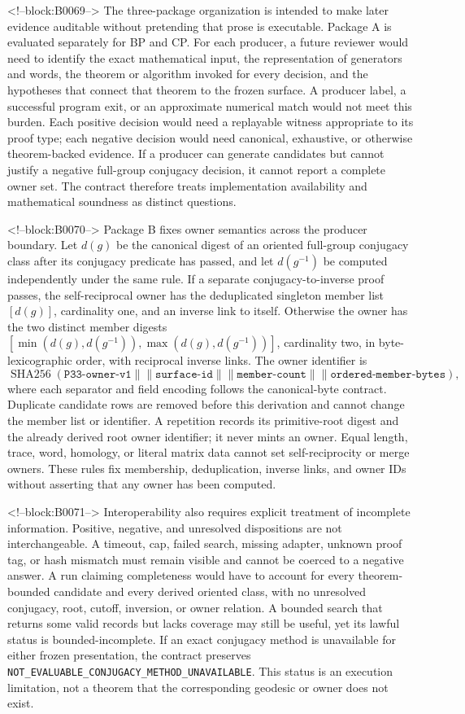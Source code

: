 \documentclass[11pt,a4paper]{article}
\begin{document}
<!--block:B0069-->
The three-package organization is intended to make later evidence auditable without pretending that prose is executable. Package A is evaluated separately for BP and CP. For each producer, a future reviewer would need to identify the exact mathematical input, the representation of generators and words, the theorem or algorithm invoked for every decision, and the hypotheses that connect that theorem to the frozen surface. A producer label, a successful program exit, or an approximate numerical match would not meet this burden. Each positive decision would need a replayable witness appropriate to its proof type; each negative decision would need canonical, exhaustive, or otherwise theorem-backed evidence. If a producer can generate candidates but cannot justify a negative full-group conjugacy decision, it cannot report a complete owner set. The contract therefore treats implementation availability and mathematical soundness as distinct questions.

<!--block:B0070-->
Package B fixes owner semantics across the producer boundary. Let \(d(g)\) be the canonical digest of an oriented full-group conjugacy class after its conjugacy predicate has passed, and let \(d(g^{-1})\) be computed independently under the same rule. If a separate conjugacy-to-inverse proof passes, the self-reciprocal owner has the deduplicated singleton member list \([d(g)]\), cardinality one, and an inverse link to itself. Otherwise the owner has the two distinct member digests \([\min(d(g),d(g^{-1})),\max(d(g),d(g^{-1}))]\), cardinality two, in byte-lexicographic order, with reciprocal inverse links. The owner identifier is
\[
 \operatorname{SHA256}(\texttt{P33-owner-v1}\mathbin{\|\!\|}\texttt{surface-id}\mathbin{\|\!\|}\texttt{member-count}\mathbin{\|\!\|}\texttt{ordered-member-bytes}),
\]
where each separator and field encoding follows the canonical-byte contract. Duplicate candidate rows are removed before this derivation and cannot change the member list or identifier. A repetition records its primitive-root digest and the already derived root owner identifier; it never mints an owner. Equal length, trace, word, homology, or literal matrix data cannot set self-reciprocity or merge owners. These rules fix membership, deduplication, inverse links, and owner IDs without asserting that any owner has been computed.

<!--block:B0071-->
Interoperability also requires explicit treatment of incomplete information. Positive, negative, and unresolved dispositions are not interchangeable. A timeout, cap, failed search, missing adapter, unknown proof tag, or hash mismatch must remain visible and cannot be coerced to a negative answer. A run claiming completeness would have to account for every theorem-bounded candidate and every derived oriented class, with no unresolved conjugacy, root, cutoff, inversion, or owner relation. A bounded search that returns some valid records but lacks coverage may still be useful, yet its lawful status is bounded-incomplete. If an exact conjugacy method is unavailable for either frozen presentation, the contract preserves \texttt{NOT\_EVALUABLE\_CONJUGACY\_METHOD\_UNAVAILABLE}. This status is an execution limitation, not a theorem that the corresponding geodesic or owner does not exist.
\end{document}
